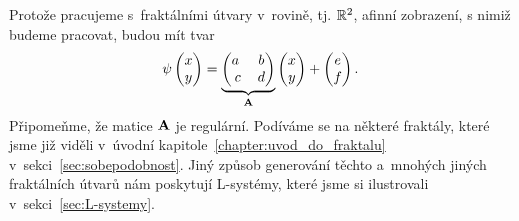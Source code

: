 Protože pracujeme s~fraktálními útvary v~rovině, tj. $\mathbb{R}^2$, afinní zobrazení, s nimiž budeme pracovat, budou mít tvar
\begin{equation}\label{eq:afinita-v-R2}
    \psi\left(\begin{matrix}
        x\\
        y
    \end{matrix}\right)=\underbrace{\left(\begin{matrix}
        a~& b\\
        c & d
    \end{matrix}\right)}_{\mathbf{A}}\left(\begin{matrix}
        x\\
        y
    \end{matrix}\right)+\left(\begin{matrix}
        e\\
        f
    \end{matrix}\right).
\end{equation}
Připomeňme, že matice $\mathbf{A}$ je regulární. Podíváme se na některé fraktály, které jsme již viděli v~úvodní kapitole~\ref{chapter:uvod_do_fraktalu} v~sekci~\ref{sec:sobepodobnost}. Jiný způsob generování těchto a~mnohých jiných fraktálních útvarů nám poskytují L-systémy, které jsme si ilustrovali v~sekci~\ref{sec:L-systemy}.

